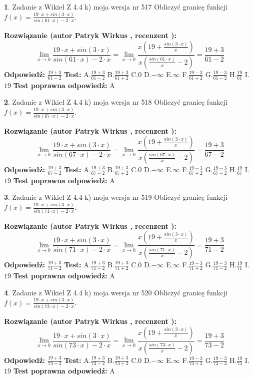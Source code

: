 \documentclass[12pt, a4paper]{article}
\theoremstyle{definition} %
\newtheorem{zad}{}
\newcommand{\zadStart}[1]{\begin{zad}#1\newline}
\newcommand{\zadStop}{\end{zad}}
\newcommand{\rozwStart}[2]{\noindent \textbf{Rozwiązanie (autor #1 , recenzent #2): }\newline}
\newcommand{\rozwStop}{\newline}
\newcommand{\odpStart}{\noindent \textbf{Odpowiedź:}\newline}
\newcommand{\odpStop}{\newline}
\newcommand{\testStart}{\noindent \textbf{Test:}\newline}
\newcommand{\testStop}{\newline}
\newcommand{\kluczStart}{\noindent \textbf{Test poprawna odpowiedź:}\newline}
\newcommand{\kluczStop}{\newline}
\begin{document}
\zadStart{Zadanie z Wikieł Z 4.4 k) moja wersja nr 517}
Obliczyć granicę funkcji $f(x)=\frac{19\cdot x +sin(3\cdot x)}{sin(61\cdot x) -2\cdot x}$.
\zadStop
\rozwStart{Patryk Wirkus}{}
$$\lim\limits_{x\to 0}\frac{19\cdot x +sin(3\cdot x)}{sin(61\cdot x) -2\cdot x}
=\lim\limits_{x\to 0}\frac{x(19+\frac{sin(3\cdot x)}{x})}{x(\frac{sin(61\cdot x)}{x}-2)}
=\frac{19+3}{61-2}$$
\rozwStop
\odpStart
$\frac{19+3}{61-2}$
\odpStop
\testStart
A.$\frac{19+3}{61-2}$
B.$\frac{19+3}{61+2}$
C.$0$
D.$-\infty$
E.$\infty$
F.$\frac{19-3}{61+2}$
G.$\frac{19-3}{61-2}$
H.$\frac{19}{61}$
I.$19$
\testStop
\kluczStart
A
\kluczStop



\zadStart{Zadanie z Wikieł Z 4.4 k) moja wersja nr 518}
Obliczyć granicę funkcji $f(x)=\frac{19\cdot x +sin(3\cdot x)}{sin(67\cdot x) -2\cdot x}$.
\zadStop
\rozwStart{Patryk Wirkus}{}
$$\lim\limits_{x\to 0}\frac{19\cdot x +sin(3\cdot x)}{sin(67\cdot x) -2\cdot x}
=\lim\limits_{x\to 0}\frac{x(19+\frac{sin(3\cdot x)}{x})}{x(\frac{sin(67\cdot x)}{x}-2)}
=\frac{19+3}{67-2}$$
\rozwStop
\odpStart
$\frac{19+3}{67-2}$
\odpStop
\testStart
A.$\frac{19+3}{67-2}$
B.$\frac{19+3}{67+2}$
C.$0$
D.$-\infty$
E.$\infty$
F.$\frac{19-3}{67+2}$
G.$\frac{19-3}{67-2}$
H.$\frac{19}{67}$
I.$19$
\testStop
\kluczStart
A
\kluczStop



\zadStart{Zadanie z Wikieł Z 4.4 k) moja wersja nr 519}
Obliczyć granicę funkcji $f(x)=\frac{19\cdot x +sin(3\cdot x)}{sin(71\cdot x) -2\cdot x}$.
\zadStop
\rozwStart{Patryk Wirkus}{}
$$\lim\limits_{x\to 0}\frac{19\cdot x +sin(3\cdot x)}{sin(71\cdot x) -2\cdot x}
=\lim\limits_{x\to 0}\frac{x(19+\frac{sin(3\cdot x)}{x})}{x(\frac{sin(71\cdot x)}{x}-2)}
=\frac{19+3}{71-2}$$
\rozwStop
\odpStart
$\frac{19+3}{71-2}$
\odpStop
\testStart
A.$\frac{19+3}{71-2}$
B.$\frac{19+3}{71+2}$
C.$0$
D.$-\infty$
E.$\infty$
F.$\frac{19-3}{71+2}$
G.$\frac{19-3}{71-2}$
H.$\frac{19}{71}$
I.$19$
\testStop
\kluczStart
A
\kluczStop



\zadStart{Zadanie z Wikieł Z 4.4 k) moja wersja nr 520}
Obliczyć granicę funkcji $f(x)=\frac{19\cdot x +sin(3\cdot x)}{sin(73\cdot x) -2\cdot x}$.
\zadStop
\rozwStart{Patryk Wirkus}{}
$$\lim\limits_{x\to 0}\frac{19\cdot x +sin(3\cdot x)}{sin(73\cdot x) -2\cdot x}
=\lim\limits_{x\to 0}\frac{x(19+\frac{sin(3\cdot x)}{x})}{x(\frac{sin(73\cdot x)}{x}-2)}
=\frac{19+3}{73-2}$$
\rozwStop
\odpStart
$\frac{19+3}{73-2}$
\odpStop
\testStart
A.$\frac{19+3}{73-2}$
B.$\frac{19+3}{73+2}$
C.$0$
D.$-\infty$
E.$\infty$
F.$\frac{19-3}{73+2}$
G.$\frac{19-3}{73-2}$
H.$\frac{19}{73}$
I.$19$
\testStop
\kluczStart
A
\kluczStop
\end{document}
